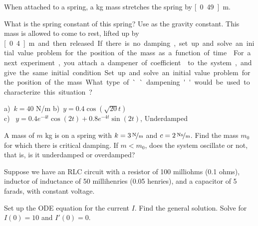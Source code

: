 \begin{exercise}
When attached to a spring, a \unit[2]{kg} mass stretches the spring by \unit[0.49]{m}. 
\begin{tasks}
\task What is the spring constant of this spring? Use  as the gravity constant.  
\task This mass is allowed to come to rest, lifted up by \unit[0.4]{m} and then released. If there is no damping, set up and solve an initial value problem for the position of the mass as a function of time.
\task For a next experiment, you attach a dampener of coefficient  to the system, and give the same initial condition. Set up and solve an initial value problem for the position of the mass. What type of ``dampening'' would be used to characterize this situation?
\end{tasks}
\end{exercise}
\comboSol{%
}
{%
a)~$k=40$ N/m \quad b)~$y = 0.4 \cos(\sqrt{20}t)$ \\
c)~ $y = 0.4 e^{-4t}\cos(2t) + 0.8e^{-4t}\sin(2t)$, Underdamped
}

\begin{exercise}\ansMark%
A mass of $m$ \unit{kg} is on a spring with $k=\unitfrac[3]{N}{m}$ and
$c=\unitfrac[2]{Ns}{m}$.  Find the mass $m_0$ for which there is critical
damping.  If $m < m_0$, does the system oscillate or not, that is, is it
underdamped or overdamped?
\end{exercise}

\begin{exercise}\ansMark%
Suppose we have an RLC circuit with a resistor of 100 milliohms (0.1 ohms),
inductor of inductance of 50 millihenries (0.05 henries), and a capacitor of 5 farads, with
constant voltage.
\begin{tasks}
\task Set up the ODE equation for the current $I$.
\task Find the general solution.
\task Solve for $I(0) = 10$ and $I'(0) = 0$.
\end{tasks}
\end{exercise}


